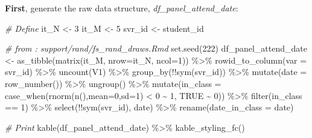 \documentclass[
]{book}
\newenvironment{Shaded}{\begin{snugshade}}{\end{snugshade}}
\newcommand{\AttributeTok}[1]{\textcolor[rgb]{0.77,0.63,0.00}{#1}}
\newcommand{\CommentTok}[1]{\textcolor[rgb]{0.56,0.35,0.01}{\textit{#1}}}
\newcommand{\ConstantTok}[1]{\textcolor[rgb]{0.00,0.00,0.00}{#1}}
\newcommand{\DecValTok}[1]{\textcolor[rgb]{0.00,0.00,0.81}{#1}}
\newcommand{\FunctionTok}[1]{\textcolor[rgb]{0.00,0.00,0.00}{#1}}
\newcommand{\NormalTok}[1]{#1}
\newcommand{\OtherTok}[1]{\textcolor[rgb]{0.56,0.35,0.01}{#1}}
\newcommand{\SpecialCharTok}[1]{\textcolor[rgb]{0.00,0.00,0.00}{#1}}
\newcommand{\StringTok}[1]{\textcolor[rgb]{0.31,0.60,0.02}{#1}}
\begin{document}
\textbf{First}, generate the raw data structure, \emph{df\_panel\_attend\_date}:

\begin{Shaded}
\begin{Highlighting}[]
\CommentTok{\# Define}
\NormalTok{it\_N }\OtherTok{\textless{}{-}} \DecValTok{3}
\NormalTok{it\_M }\OtherTok{\textless{}{-}} \DecValTok{5}
\NormalTok{svr\_id }\OtherTok{\textless{}{-}} \StringTok{\textquotesingle{}student\_id\textquotesingle{}}

\CommentTok{\# from : support/rand/fs\_rand\_draws.Rmd}
\FunctionTok{set.seed}\NormalTok{(}\DecValTok{222}\NormalTok{)}
\NormalTok{df\_panel\_attend\_date }\OtherTok{\textless{}{-}} \FunctionTok{as\_tibble}\NormalTok{(}\FunctionTok{matrix}\NormalTok{(it\_M, }\AttributeTok{nrow=}\NormalTok{it\_N, }\AttributeTok{ncol=}\DecValTok{1}\NormalTok{)) }\SpecialCharTok{\%\textgreater{}\%}
  \FunctionTok{rowid\_to\_column}\NormalTok{(}\AttributeTok{var =}\NormalTok{ svr\_id) }\SpecialCharTok{\%\textgreater{}\%}
  \FunctionTok{uncount}\NormalTok{(V1) }\SpecialCharTok{\%\textgreater{}\%}
  \FunctionTok{group\_by}\NormalTok{(}\SpecialCharTok{!!}\FunctionTok{sym}\NormalTok{(svr\_id)) }\SpecialCharTok{\%\textgreater{}\%} \FunctionTok{mutate}\NormalTok{(}\AttributeTok{date =} \FunctionTok{row\_number}\NormalTok{()) }\SpecialCharTok{\%\textgreater{}\%}
  \FunctionTok{ungroup}\NormalTok{() }\SpecialCharTok{\%\textgreater{}\%} \FunctionTok{mutate}\NormalTok{(}\AttributeTok{in\_class =} \FunctionTok{case\_when}\NormalTok{(}\FunctionTok{rnorm}\NormalTok{(}\FunctionTok{n}\NormalTok{(),}\AttributeTok{mean=}\DecValTok{0}\NormalTok{,}\AttributeTok{sd=}\DecValTok{1}\NormalTok{) }\SpecialCharTok{\textless{}} \DecValTok{0} \SpecialCharTok{\textasciitilde{}} \DecValTok{1}\NormalTok{, }\ConstantTok{TRUE} \SpecialCharTok{\textasciitilde{}} \DecValTok{0}\NormalTok{)) }\SpecialCharTok{\%\textgreater{}\%}
  \FunctionTok{filter}\NormalTok{(in\_class }\SpecialCharTok{==} \DecValTok{1}\NormalTok{) }\SpecialCharTok{\%\textgreater{}\%} \FunctionTok{select}\NormalTok{(}\SpecialCharTok{!!}\FunctionTok{sym}\NormalTok{(svr\_id), date) }\SpecialCharTok{\%\textgreater{}\%}
  \FunctionTok{rename}\NormalTok{(}\AttributeTok{date\_in\_class =}\NormalTok{ date)}

\CommentTok{\# Print}
\FunctionTok{kable}\NormalTok{(df\_panel\_attend\_date) }\SpecialCharTok{\%\textgreater{}\%}
  \FunctionTok{kable\_styling\_fc}\NormalTok{()}
\end{Highlighting}
\end{Shaded}
\end{document}
